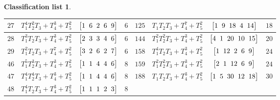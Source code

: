 \documentclass[pdftex]{sigma}%
\theoremstyle{definition}
\newtheorem{class-list}[thm]{Classification list}
\numberwithin{equation}{section}
\begin{document}
\begin{class-list}
\begin{table}[h!]
\begin{tabu}{c|c|c|c||c|c|c|c}
\\ \hline
${27}$&${T_{1}^{4}T_{2}^{2}T_{3}+T_{4}^{3}+T_{5}^{2}}$
&$\arraycolsep=1mm\begin{bmatrix}{1} & {6} & {2} & {6} & {9}\end{bmatrix}$&${6}$
&${125}$&${T_{1}T_{2}T_{3}+T_{4}^{7}+T_{5}^{2}}$
&$\arraycolsep=1mm\begin{bmatrix}{1} & {9} & {18} & {4} & {14}\end{bmatrix}$&${18}$
\\ \hline
${28}$&${T_{1}^{3}T_{2}T_{3}+T_{4}^{3}+T_{5}^{2}}$
&$\arraycolsep=1mm\begin{bmatrix}{2} & {3} & {3} & {4} & {6}\end{bmatrix}$&${6}$
&${144}$&${T_{1}^{2}T_{2}^{2}T_{3}+T_{4}^{3}+T_{5}^{2}}$
&$\arraycolsep=1mm\begin{bmatrix}{4} & {1} & {20} & {10} & {15}\end{bmatrix}$&${20}$
\\ \hline
${29}$&${T_{1}^{2}T_{2}T_{3}+T_{4}^{7}+T_{5}^{2}}$
&$\arraycolsep=1mm\begin{bmatrix}{3} & {2} & {6} & {2} & {7}\end{bmatrix}$&${6}$
&${158}$&${T_{1}^{4}T_{2}T_{3}+T_{4}^{3}+T_{5}^{2}}$
&$\arraycolsep=1mm\begin{bmatrix}{1} & {12} & {2} & {6} & {9}\end{bmatrix}$&${24}$
\\ \hline
${46}$&${T_{1}^{5}T_{2}^{3}T_{3}+T_{4}^{3}+T_{5}^{2}}$
&$\arraycolsep=1mm\begin{bmatrix}{1} & {1} & {4} & {4} & {6}\end{bmatrix}$&${8}$
&${159}$&${T_{1}^{2}T_{2}^{2}T_{3}+T_{4}^{3}+T_{5}^{2}}$
&$\arraycolsep=1mm\begin{bmatrix}{2} & {1} & {12} & {6} & {9}\end{bmatrix}$&${24}$
\\ \hline
${47}$&${T_{1}^{4}T_{2}^{4}T_{3}+T_{4}^{3}+T_{5}^{2}}$
&$\arraycolsep=1mm\begin{bmatrix}{1} & {1} & {4} & {4} & {6}\end{bmatrix}$&${8}$
&${188}$&${T_{1}T_{2}T_{3}+T_{4}^{3}+T_{5}^{2}}$
&$\arraycolsep=1mm\begin{bmatrix}{1} & {5} & {30} & {12} & {18}\end{bmatrix}$&${30}$
\\
\hline
${48}$&${T_{1}^{4}T_{2}T_{3}+T_{4}^{3}+T_{5}^{2}}$
&$\arraycolsep=1mm\begin{bmatrix}{1} & {1} & {1} & {2} & {3}\end{bmatrix}$&${8}$

\end{tabu}
\end{table}
\end{class-list}
\end{document}
